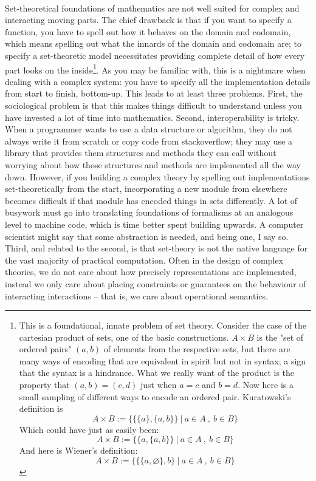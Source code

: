 \\
Set-theoretical foundations of mathematics are not well suited for complex and interacting moving parts. The chief drawback is that if you want to specify a function, you have to spell out how it behaves on the domain and codomain, which means spelling out what the innards of the domain and codomain are; to specify a set-theoretic model necessitates providing complete detail of how every part looks on the inside\footnote{This is a foundational, innate problem of set theory. Consider the case of the cartesian product of sets, one of the basic constructions. $A \times B$ is the "set of ordered pairs" $(a,b)$ of elements from the respective sets, but there are many ways of encoding that are equivalent in spirit but not in syntax; a sign that the syntax is a hindrance. What we really want of the product is the property that $(a,b) = (c,d)$ just when $a = c$ and $b = d$. Now here is a small sampling of different ways to encode an ordered pair. Kuratowski's definition is
\[A \times B := \bigg\{ \{\{a\},\{a,b\}\} \ | \ a \in A \ , \ b \in B \bigg\}\]
Which could have just as easily been:
\[A \times B := \bigg\{ \{a,\{a,b\}\} \ | \ a \in A \ , \ b \in B \bigg\}\]
And here is Wiener's definition:
\[A \times B := \bigg\{ \{\{a,\varnothing\},b\} \ | \ a \in A \ , \ b \in B \bigg\}\]}. As you may be familiar with, this is a nightmare when dealing with a complex system: you have to specify all the implementation details from start to finish, bottom-up. This leads to at least three problems. First, the sociological problem is that this makes things difficult to understand unless you have invested a lot of time into mathematics. Second, interoperability is tricky. When a programmer wants to use a data structure or algorithm, they do not always write it from scratch or copy code from stackoverflow; they may use a library that provides them structures and methods they can call without worrying about how those structures and methods are implemented all the way down. However, if you building a complex theory by spelling out implementations set-theoretically from the start, incorporating a new module from elsewhere becomes difficult if that module has encoded things in sets differently. A lot of busywork must go into translating foundations of formalisms at an analogous level to machine code, which is time better spent building upwards. A computer scientist might say that some abstraction is needed, and being one, I say so. Third, and related to the second, is that set-theory is not the native language for the vast majority of practical computation. Often in the design of complex theories, we do not care about how precisely representations are implemented, instead we only care about placing constraints or guarantees on the behaviour of interacting interactions -- that is, we care about operational semantics.

